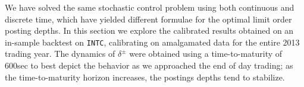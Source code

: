 We have solved the same stochastic control problem using both continuous and discrete time, which have yielded different formulae for the optimal limit order posting depths. In this section we explore the calibrated results obtained on an in-sample backtest on \texttt{INTC}, calibrating on amalgamated data for the entire 2013 trading year. The dynamics of $\delta^\pm$ were obtained using a time-to-maturity of 600sec to best depict the behavior as we approached the end of day trading; as the time-to-maturity horizon increases, the postings depths tend to stabilize. 
%  
%   
%   
%   
%
%
%
